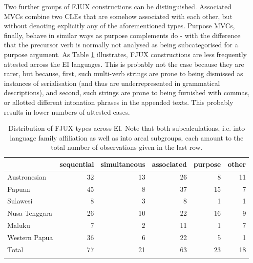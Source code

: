 Two further groups of FJUX constructions can be distinguished. Associated MVCs combine two CLEs that are somehow associated with each other, but without denoting explicitly any of the aforementioned types. Purpose MVCs, finally, behave in similar ways as purpose complements do - with the difference that the precursor verb is normally not analysed as being subcategorised for a purpose argument. As Table \ref{table:FJUX_overview} illustrates, FJUX constructions are less frequently attested across the EI languages. This is probably not the case because they are rarer, but because, first, such multi-verb strings are prone to being dismissed as instances of serialisation (and thus are underrepresented in grammatical descriptions), and second, such strings are prone to being furnished with commas, or allotted different intonation phrases in the appended texts. This probably results in lower numbers of attested cases.

\begin{table}
\begin{tabular}{lrrrrr}
  \lsptoprule
 & {sequential} & {simultaneous} & {associated} & {purpose} & {other} \\  
  \midrule
  Austronesian & 32 & 13 & 26 & 8 & 11 \tabularnewline
  Papuan & 45 & 8 & 37 &  15 & 7 \tabularnewline
   \midrule
  Sulawesi & 8 & 3 & 8 & 1 & 1 \tabularnewline
  Nusa Tenggara & 26 & 10 & 22 & 16 & 9 \tabularnewline
  Maluku & 7 & 2 & 11 & 1 & 7 \tabularnewline 
  Western Papua & 36 & 6 & 22 & 5 & 1 \tabularnewline 
\lsptoprule
Total & 77 & 21 & 63 & 23 & 18 \tabularnewline
\lspbottomrule
\end{tabular}
\caption[Distribution of FJUX types across EI]{Distribution of FJUX types across EI. Note that both subcalculations, i.e. into language family affiliation as well as into areal subgroups, each amount to the total number of observations given in the last row.}
\label{table:FJUX_overview}
\end{table}

